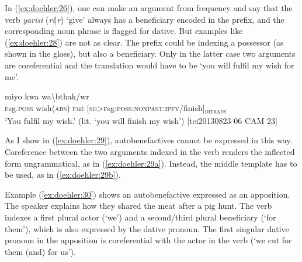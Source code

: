 \documentclass[output=paper]{langscibook}
\begin{document}
In (\ref{ex:doehler:26}), one can make an argument from frequency and say that the verb \emph{yarisi} (\emph{ri}|\emph{r}) `give' always has a beneficiary encoded in the prefix, and the corresponding noun phrase is flagged for dative. But examples like (\ref{ex:doehler:28}) are not as clear. The prefix could be indexing a possessor (as shown in the gloss), but also a beneficiary. Only in the latter case two arguments are coreferential and the translation would have to be `you will fulfil my wish for me'.


	\ea
	 {miyo} {kwa} {wa\textbackslash{bthak}/wr}\\
	\textsc{f}sg.\textsc{poss}{} wish(\textsc{abs}) \textsc{f}ut{} [\textsc{sg}>\textsc{f}sg:\textsc{poss}:\textsc{nonpast}:\textsc{ipfv}/finish]\textsubscript{\textsc{ditrans}}\\
	\glt `You fulfil my wish.' (lit. `you will finish my wish') [tci20130823-06 CAM 23]
	\label{ex:doehler:28}
	\z


As I show in (\ref{ex:doehler:29}), autobenefactives cannot be expressed in this way. Coreference between the two arguments indexed in the verb renders the inflected form ungrammatical, as in (\ref{ex:doehler:29a}). Instead, the middle template has to be used, as in (\ref{ex:doehler:29b}).


	\ea
	\label{ex:doehler:29}
			\label{ex:doehler:29a}
			
		\z
		\z
	


Example (\ref{ex:doehler:30}) shows an autobenefactive expressed as an apposition. The speaker explains how they shared the meat after a pig hunt. The verb indexes a first plural actor (`we') and a second/third plural beneficiary (`for them'), which is also expressed by the dative pronoun. The first singular dative pronoun in the apposition is coreferential with the actor in the verb (`we cut for them (and) for us').
\end{document}
